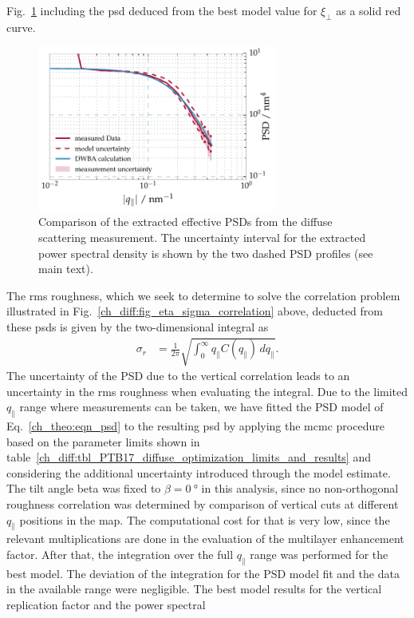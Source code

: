 Fig.~\ref{ch_diff:fig_CrSc_diffuse_PSD} including the \gls{psd} deduced from the best model 
value for $\xi_\perp$ as a solid red curve.
\begin{figure}[htbp]
  \centering
  \includegraphics[width=0.7\textwidth]{img/CrSc_diffuse_PSD}
  \caption{Comparison of the extracted effective PSDs from the diffuse 
scattering measurement. The 
uncertainty interval for the extracted power spectral density is shown by the 
two dashed PSD profiles (see main text).}
  \label{ch_diff:fig_CrSc_diffuse_PSD}
\end{figure}
The \gls{rms} roughness, which we seek to determine to solve the correlation problem illustrated in Fig.~\ref{ch_diff:fig_eta_sigma_correlation} above, deducted from these \gls{psd}s is given by the two-dimensional integral as
\begin{align}
\sigma_r &=\frac{1}{2\pi} \sqrt{\int_{0}^{\infty} q_\parallel C(q_\parallel) \, 
dq_\parallel} \text{.}
\end{align}
The uncertainty of the PSD due to the vertical correlation leads to an 
uncertainty in the \gls{rms} roughness when evaluating the integral. Due to the 
limited $q_\parallel$ range where measurements can be taken, we have fitted the 
PSD model of Eq.~\eqref{ch_theo:eqn_psd} to the resulting \gls{psd} by applying the \gls{mcmc} procedure based on the parameter limits shown in table~\ref{ch_diff:tbl_PTB17_diffuse_optimization_limits_and_results} and considering the additional uncertainty introduced through the model estimate. The tilt angle beta was fixed to $\beta=\SI{0}{\degree}$ in this analysis, since no non-orthogonal roughness correlation was determined by comparison of vertical cuts at different $q_\parallel$ positions in the map. The computational cost for that is very low, since the relevant multiplications are done in the evaluation of the multilayer enhancement factor. After that, the integration over the full $q_\parallel$ range was performed for the best model. The deviation of the integration for the PSD model fit and the data in the available range were negligible. The best model results for the vertical replication factor and the power spectral 
